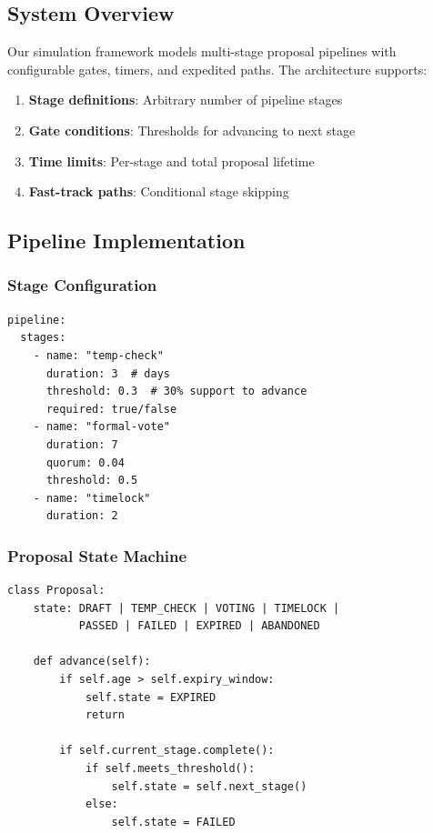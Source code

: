 
\subsection{System Overview}

Our simulation framework models multi-stage proposal pipelines with configurable gates, timers, and expedited paths. The architecture supports:

\begin{enumerate}
    \item \textbf{Stage definitions}: Arbitrary number of pipeline stages
    \item \textbf{Gate conditions}: Thresholds for advancing to next stage
    \item \textbf{Time limits}: Per-stage and total proposal lifetime
    \item \textbf{Fast-track paths}: Conditional stage skipping
\end{enumerate}

\subsection{Pipeline Implementation}

\subsubsection{Stage Configuration}

\begin{lstlisting}[caption=Pipeline stage configuration (pseudocode)]
pipeline:
  stages:
    - name: "temp-check"
      duration: 3  # days
      threshold: 0.3  # 30% support to advance
      required: true/false
    - name: "formal-vote"
      duration: 7
      quorum: 0.04
      threshold: 0.5
    - name: "timelock"
      duration: 2
\end{lstlisting}

\subsubsection{Proposal State Machine}

\begin{lstlisting}[caption=Proposal state machine (pseudocode)]
class Proposal:
    state: DRAFT | TEMP_CHECK | VOTING | TIMELOCK |
           PASSED | FAILED | EXPIRED | ABANDONED

    def advance(self):
        if self.age > self.expiry_window:
            self.state = EXPIRED
            return

        if self.current_stage.complete():
            if self.meets_threshold():
                self.state = self.next_stage()
            else:
                self.state = FAILED
\end{lstlisting}

